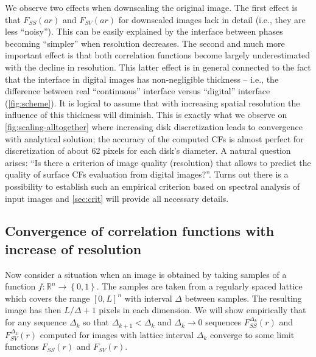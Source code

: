 \documentclass[reprint,amsmath,amssymb,aps,pre,showkeys,showpacs]{revtex4-1}
\begin{document}
We observe two effects when downscaling the original image. The
first effect is that $F_{SS}(ar)$ and $F_{SV}(ar)$ for downscaled images lack in
detail (i.e., they are less ``noisy''). This can be easily explained by the
interface between phases becoming ``simpler'' when resolution decreases. The
second and much more important effect is that both correlation functions become
largely underestimated with the decline in resolution. This latter effect is in
general connected to the fact that the interface in digital images has
non-negligible thickness -- i.e., the difference between real ``continuous''
interface versus ``digital'' interface (\cref{fig:scheme}). It is logical to
assume that with increasing spatial resolution the influence of this thickness
will diminish. This is exactly what we observe on \cref{fig:scaling-alltogether}
where increasing disk discretization leads to convergence with analytical
solution; the accuracy of the computed CFs is almost perfect for discretization
of about 62 pixels for each disk's diameter. A natural question arises: ``Is
there a criterion of image quality (resolution) that allows to predict the
quality of surface CFs evaluation from digital images?''. Turns out there is a
possibility to establish such an empirical criterion based on spectral analysis
of input images and \cref{sec:crit} will provide all necessary details.

\subsection{Convergence of correlation functions with increase of resolution}
\label{sec:value-noise}
Now consider a situation when an image is obtained by taking samples of a function
$f: \mathbb{R}^n \rightarrow \left\{0, 1\right\}$. The samples are taken from a
regularly spaced lattice which covers the range $[0, L]^n$  with interval
$\Delta$ between samples. The resulting image has then $L/\Delta + 1$ pixels in
each dimension. We will show empirically that for any sequence $\Delta_k$ so
that $\Delta_{k+1} < \Delta_k$ and $\Delta_k \rightarrow 0$ sequences
$F_{SS}^{\Delta_k}(r)$ and $F_{SV}^{\Delta_k}(r)$ computed for images with
lattice interval $\Delta_k$ converge to some limit functions $F_{SS}(r)$ and
$F_{SV}(r)$.
\end{document}
